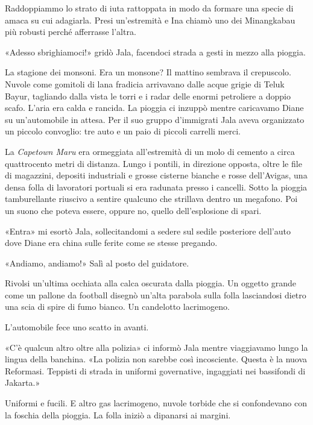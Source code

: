 Raddoppiammo lo strato di iuta rattoppata in modo da formare una specie
di amaca su cui adagiarla. Presi un'estremità e Ina chiamò uno dei
Minangkabau più robusti perché afferrasse l'altra.

«Adesso sbrighiamoci!» gridò Jala, facendoci strada a gesti in mezzo
alla pioggia.

\separatorefiori

La stagione dei monsoni. Era un monsone? Il mattino sembrava il
crepuscolo. Nuvole come gomitoli di lana fradicia arrivavano dalle acque
grigie di Teluk Bayur, tagliando dalla vista le torri e i radar delle
enormi petroliere a doppio scafo. L'aria era calda e rancida. La pioggia
ci inzuppò mentre caricavamo Diane su un'automobile in attesa. Per il
suo gruppo d'immigrati Jala aveva organizzato un piccolo convoglio: tre
auto e un paio di piccoli carrelli merci.

La \emph{Capetown Maru} era ormeggiata all'estremità di un molo di
cemento a circa quattrocento metri di distanza. Lungo i pontili, in
direzione opposta, oltre le file di magazzini, depositi industriali e
grosse cisterne bianche e rosse dell'Avigas, una densa folla di
lavoratori portuali si era radunata presso i cancelli. Sotto la pioggia
tamburellante riuscivo a sentire qualcuno che strillava dentro un
megafono. Poi un suono che poteva essere, oppure no, quello
dell'esplosione di spari.

«Entra» mi esortò Jala, sollecitandomi a sedere sul sedile posteriore
dell'auto dove Diane era china sulle ferite come se stesse pregando.

«Andiamo, andiamo!» Salì al posto del guidatore.

Rivolsi un'ultima occhiata alla calca oscurata dalla pioggia. Un oggetto
grande come un pallone da football disegnò un'alta parabola sulla folla
lasciandosi dietro una scia di spire di fumo bianco. Un candelotto
lacrimogeno.

L'automobile fece uno scatto in avanti.

\separatorefiori

«C'è qualcun altro oltre alla polizia» ci informò Jala mentre
viaggiavamo lungo la lingua della banchina. «La polizia non sarebbe così
incosciente. Questa è la nuova Reformasi. Teppisti di strada in uniformi
governative, ingaggiati nei bassifondi di Jakarta.»

Uniformi e fucili. E altro gas lacrimogeno, nuvole torbide che si
confondevano con la foschia della pioggia. La folla iniziò a dipanarsi
ai margini.

